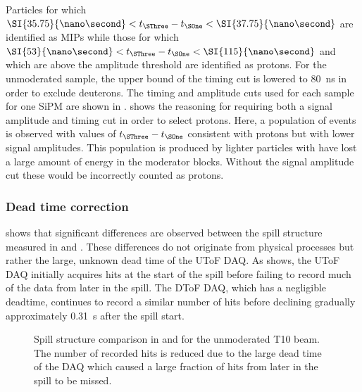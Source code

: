 Particles for which $\SI{35.75}{\nano\second} < t_{\SThree} - t_{\SOne} < \SI{37.75}{\nano\second}$ are identified as MIPs while those for which $\SI{53}{\nano\second} < t_{\SThree} - t_{\SOne} < \SI{115}{\nano\second}$ and which are above the amplitude threshold are identified as protons.
For the unmoderated sample, the upper bound of the timing cut is lowered to \SI{80}{\nano\second} in order to exclude deuterons.
The timing and amplitude cuts used for each sample for one SiPM are shown in .
 shows the reasoning for requiring both a signal amplitude and timing cut in order to select protons.
Here, a population of events is observed with values of $t_{\SThree} - t_{\SOne}$ consistent with protons but with lower signal amplitudes. 
This population is produced by lighter particles with have lost a large amount of energy in the moderator blocks.
Without the signal amplitude cut these would be incorrectly counted as protons.

\subsubsection{Dead time correction}
\label{sec:hptpc_beam_flux:methods:s3:deadtime}

 shows that significant differences are observed between the spill structure measured in \SThree and \SFour.
These differences do not originate from physical processes but rather the large, unknown dead time of the UToF DAQ.
As  shows, the UToF DAQ initially acquires hits at the start of the spill before failing to record much of the data from later in the spill.
The DToF DAQ, which has a negligible deadtime, continues to record a similar number of hits before declining gradually approximately \SI{0.31}{\second} after the spill start.

\begin{figure}[h]
  \begin{adjustbox}{max totalsize=.75\textwidth, center}
    
  \end{adjustbox}
  \caption[Spill structure comparison in \SThree and \SFour]{Spill structure comparison in \SThree and \SFour for the unmoderated T10 beam. The number of recorded \SThree hits is reduced due to the large dead time of the DAQ which caused a large fraction of hits from later in the spill to be missed.}
  \label{fig:spillStructureComp}
\end{figure}

